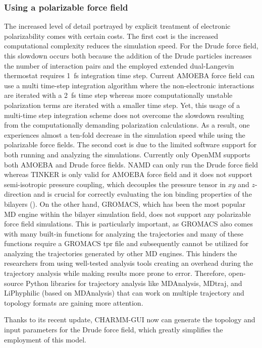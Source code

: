 \documentclass[journal=jacsat,manuscript=article,layout=singlecolumn]{achemso}
\begin{document}
\subsubsection{Using a polarizable force field}

The increased level of detail portrayed by explicit treatment of electronic polarizability comes with certain costs. The first cost is the increased computational complexity reduces the simulation speed. For the Drude force field, this slowdown occurs both because the addition of the Drude particles increases the number of interaction pairs and the employed extended dual-Langevin thermostat requires 1~fs integration time step. Current AMOEBA force field can use a multi time-step integration algorithm where the non-electronic interactions are iterated with a 2~fs time step whereas more computationally unstable polarization terms are iterated with a smaller time step. Yet, this usage of a multi-time step integration scheme does not overcome the slowdown resulting from the computationally demanding polarization calculations. As a result, one experiences almost a ten-fold decrease in the simulation speed while using the polarizable force fields. The second cost is due to the limited software support for both running and analyzing the simulations. Currently only OpenMM supports both AMOEBA and Drude force fields. NAMD can only run the Drude force field whereas TINKER is only valid for AMOEBA force field and it does not support semi-isotropic pressure coupling, which decouples the pressure tensor in $xy$ and $z$-direction and is crucial for correctly evaluating the ion binding properties of the bilayers (). On the other hand, GROMACS, which has been the most popular MD engine within the bilayer simulation field, does not support any polarizable force field simulations. This is particularly important, as GROMACS also comes with many built-in functions for analyzing the trajectories and many of these functions require a GROMACS tpr file and subsequently cannot be utilized for analyzing the trajectories generated by other MD engines. This hinders the researchers from using well-tested analysis tools creating an overhead during the trajectory analysis while making results more prone to error. Therefore, open-source Python libraries for trajectory analysis like MDAnalysis, MDtraj, and LiPhyphilic (based on MDAnalysis) that can work on multiple trajectory and topology formats are gaining more attention.

Thanks to its recent update, CHARMM-GUI now can generate the topology and input parameters for the Drude force field, which greatly simplifies the employment of this model.
\end{document}
